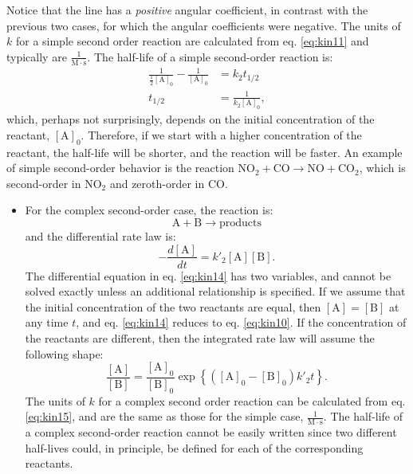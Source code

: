 \documentclass[
  9pt,
]{extbook}
\providecommand{\tightlist}{%
  \setlength{\itemsep}{0pt}\setlength{\parskip}{0pt}}
\theoremstyle{definition}
\theoremstyle{definition}
\theoremstyle{definition}
\theoremstyle{remark}
\begin{document}
Notice that the line has a \emph{positive} angular coefficient, in contrast with the previous two cases, for which the angular coefficients were negative. The units of \(k\) for a simple second order reaction are calculated from eq. \eqref{eq:kin11} and typically are \(\frac{1}{\mathrm{M}\cdot \mathrm{s}}\).
The half-life of a simple second-order reaction is:
\begin{equation}
\begin{aligned}
\frac{1}{\frac{1}{2}[\mathrm{A}]_0}-\frac{1}{[\mathrm{A}]_0} &= k_2 t_{1/2} \\
t_{1/2} &= \frac{1}{k_2 [\mathrm{A}]_0},
\end{aligned}
\label{eq:kin12}
\end{equation}
which, perhaps not surprisingly, depends on the initial concentration of the reactant, \([\mathrm{A}]_0\). Therefore, if we start with a higher concentration of the reactant, the half-life will be shorter, and the reaction will be faster. An example of simple second-order behavior is the reaction \(\mathrm{NO}_2 + \mathrm{CO} \rightarrow \mathrm{NO} + \mathrm{CO}_2\), which is second-order in \(\mathrm{NO}_2\) and zeroth-order in \(\mathrm{CO}\).

\begin{itemize}
\tightlist
\item
  For the complex second-order case, the reaction is:
  \begin{equation}
  \mathrm{A}+\mathrm{B}\rightarrow \text{products}
  \end{equation}
  and the differential rate law is:
  \begin{equation}
  -\frac{d[\mathrm{A}]}{dt}=k'_2 [\mathrm{A}][\mathrm{B}].
  \label{eq:kin14}
  \end{equation}
  The differential equation in eq. \eqref{eq:kin14} has two variables, and cannot be solved exactly unless an additional relationship is specified. If we assume that the initial concentration of the two reactants are equal, then \([\mathrm{A}]=[\mathrm{B}]\) at any time \(t\), and eq. \eqref{eq:kin14} reduces to eq. \eqref{eq:kin10}. If the concentration of the reactants are different, then the integrated rate law will assume the following shape:
  \begin{equation}
  \frac{\mathrm{[A]}}{\mathrm{[B]}} = \frac{\mathrm{[A]_0}}{\mathrm{[B]_0}} \exp \left\{ \left(\mathrm{[A]_0} - \mathrm{[B]_0}\right) k'_2t \right\}.
  \label{eq:kin15}
  \end{equation}
  The units of \(k\) for a complex second order reaction can be calculated from eq. \eqref{eq:kin15}, and are the same as those for the simple case, \(\frac{1}{\mathrm{M}\cdot \mathrm{s}}\).
  The half-life of a complex second-order reaction cannot be easily written since two different half-lives could, in principle, be defined for each of the corresponding reactants.
\end{itemize}
\end{document}

